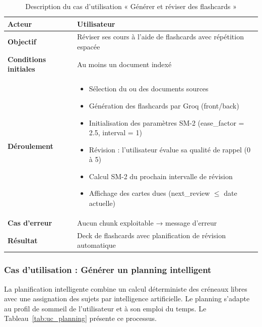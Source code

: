 \begin{table}[H]
\centering
\renewcommand{\arraystretch}{1.2}
\begin{tabular}{|p{4cm}|p{10cm}|}
\hline
\textbf{Acteur} & Utilisateur \\ \hline

\textbf{Objectif} & Réviser ses cours à l'aide de flashcards avec répétition espacée \\ \hline

\textbf{Conditions initiales} & Au moins un document indexé \\ \hline

\textbf{Déroulement} &
\begin{itemize}
    \item Sélection du ou des documents sources
    \item Génération des flashcards par Groq (front/back)
    \item Initialisation des paramètres SM-2 (ease\_factor = 2.5, interval = 1)
    \item Révision : l'utilisateur évalue sa qualité de rappel (0 à 5)
    \item Calcul SM-2 du prochain intervalle de révision
    \item Affichage des cartes dues (next\_review $\leq$ date actuelle)
\end{itemize} \\ \hline

\textbf{Cas d'erreur} & Aucun chunk exploitable → message d'erreur \\ \hline

\textbf{Résultat} & Deck de flashcards avec planification de révision automatique \\ \hline
\end{tabular}
\caption{Description du cas d'utilisation « Générer et réviser des flashcards »}
\label{tab:uc_flashcard}
\end{table}

\subsubsection{Cas d'utilisation : Générer un planning intelligent}

La planification intelligente combine un calcul déterministe des créneaux libres avec une assignation des sujets par intelligence artificielle. Le planning s'adapte au profil de sommeil de l'utilisateur et à son emploi du temps. Le Tableau~\ref{tab:uc_planning} présente ce processus.


